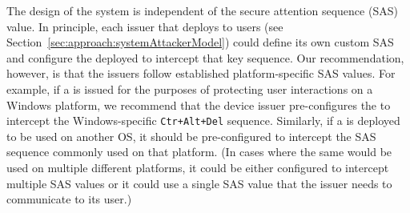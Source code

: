 The design of the \name system is independent of the secure attention sequence (SAS) value. In principle, each issuer that deploys \device to users (see Section~\ref{sec:approach:systemAttackerModel}) could define its own custom SAS and configure the deployed \device to intercept that key sequence. Our recommendation, however, is that the \device issuers follow established platform-specific SAS values. For example, if a \device is issued for the purposes of protecting user interactions on a  Windows platform, we recommend that the device issuer pre-configures the \device to intercept the Windows-specific \texttt{Ctr+Alt+Del} sequence. Similarly, if a \device is deployed to be used on another OS, it should be pre-configured to intercept the SAS sequence commonly used on that platform. (In cases where the same \device would be used on multiple different platforms, it could be either configured to intercept multiple SAS values or it could use a single SAS value that the issuer needs to communicate to its user.)



